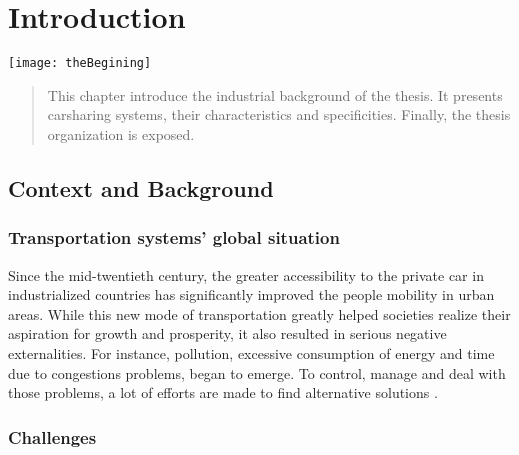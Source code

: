 \chapter{Introduction} \label{chap:introduction}
\begin{bibunit}[ieeetr]
\minitoc
\vspace{2cm}
%
\noindent
\begin{minipage}[c]{0.45\textwidth}
\texttt{[image: theBegining]}
\end{minipage}
\hfill
\begin{minipage}[c]{0.45\textwidth}
\begin{abstract}
This chapter introduce the industrial background of the thesis.
It presents carsharing systems, their characteristics and specificities.
Finally, the thesis organization is exposed.
\end{abstract}
\end{minipage}

\newpage
\section{Context and Background}

\subsection{Transportation systems' global situation}
Since the mid-twentieth century, the greater accessibility to the private car in industrialized countries has significantly improved the people mobility in urban areas. 
While this new mode of transportation greatly helped societies realize their aspiration for growth and prosperity, it also resulted in serious negative externalities.
For instance, pollution, excessive consumption of energy and time due to congestions problems, began to emerge.
To control, manage and deal with those problems, a lot of efforts are made to find alternative solutions \cite{mitchell_reinventing_2010}.

\subsection{Challenges}


\end{bibunit}
